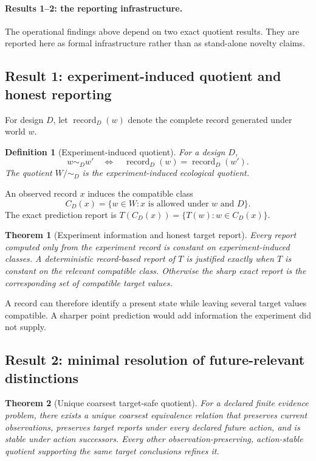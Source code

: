 \documentclass[11pt]{article}
\newtheorem{theorem}{Theorem}
\newtheorem{definition}{Definition}
\begin{document}
\paragraph{Results 1--2: the reporting infrastructure.}
The operational findings above depend on two exact quotient results. They are reported here as formal infrastructure rather than as stand-alone novelty claims.

\subsection{Result 1: experiment-induced quotient and honest reporting}
For design $D$, let $\operatorname{record}_D(w)$ denote the complete record generated under world $w$.

\begin{definition}[Experiment-induced quotient]
For a design $D$,
\[
w\sim_D w' \quad\Longleftrightarrow\quad \operatorname{record}_D(w)=\operatorname{record}_D(w').
\]
The quotient $W/{\sim_D}$ is the experiment-induced ecological quotient.
\end{definition}

An observed record $x$ induces the compatible class
\[
C_D(x)=\{w\in W:x\text{ is allowed under }w\text{ and }D\}.
\]
The exact prediction report is $T(C_D(x))=\{T(w):w\in C_D(x)\}$.

\begin{theorem}[Experiment information and honest target report]
Every report computed only from the experiment record is constant on experiment-induced classes. A deterministic record-based report of $T$ is justified exactly when $T$ is constant on the relevant compatible class. Otherwise the sharp exact report is the corresponding set of compatible target values.
\end{theorem}

A record can therefore identify a present state while leaving several target values compatible. A sharper point prediction would add information the experiment did not supply.

\subsection{Result 2: minimal resolution of future-relevant distinctions}
\begin{theorem}[Unique coarsest target-safe quotient]
For a declared finite evidence problem, there exists a unique coarsest equivalence relation that preserves current observations, preserves target reports under every declared future action, and is stable under action successors. Every other observation-preserving, action-stable quotient supporting the same target conclusions refines it.
\end{theorem}
\end{document}
